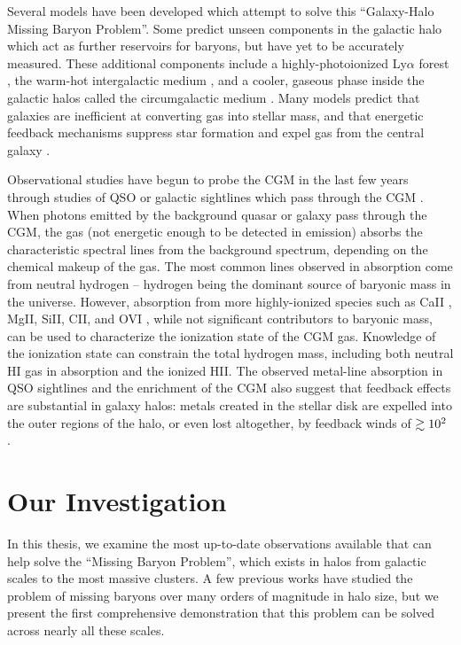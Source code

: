 Several models have been developed which attempt to solve this
``Galaxy-Halo Missing Baryon Problem''. Some predict unseen components
in the galactic halo which act as further reservoirs for baryons, but
have yet to be accurately measured.  These additional components
include a highly-photoionized Ly$\alpha$ forest \citep{Sargent1980,
  Cen1994}, the warm-hot intergalactic medium \citep[WHIM][]{Cen1999,
  Dave1999}, and a cooler, gaseous phase inside the galactic halos
called the circumgalactic medium \citep[CGM][]{Bahcall1969,
  Bergeron1985, Lanzetta1995}. Many models predict that galaxies are inefficient at
converting gas into stellar mass, and that energetic feedback
mechanisms suppress star formation and expel gas from the central
galaxy \citep{Somerville1999, Oppenheimer2010}. 

Observational studies have begun to probe the CGM in the last few
years through studies of QSO or galactic sightlines which pass through
the CGM \citep{Steidel2010, Prochaska2011, Tumlinson2011,
  Werk2013}. When photons emitted by the background quasar or galaxy
pass through the CGM, the gas (not energetic enough to be detected in
emission) absorbs the characteristic spectral lines from the
background spectrum, depending on the chemical makeup of the gas. The
most common lines observed in absorption come from neutral hydrogen --
hydrogen being the dominant source of baryonic mass in the
universe. However, absorption from more highly-ionized species such as
CaII \citep{Zhu2013}, MgII, SiII, CII, and OVI \citep{Tumlinson2011,
  Werk2014}, while not significant contributors to baryonic mass, can
be used to characterize the ionization state of the CGM gas. Knowledge
of the ionization state can constrain the total hydrogen mass,
including both neutral HI gas in absorption and the ionized HII. The
observed metal-line absorption in QSO sightlines and the enrichment of
the CGM also suggest that feedback effects are substantial in galaxy
halos: metals created in the stellar disk are expelled into the outer
regions of the halo, or even lost altogether, by feedback winds of
$\gtrsim 10^2$ \kms{} \citep{D'Odorico1991, Chen2010, Oppenheimer2012,
  Booth2012}.

\section{Our Investigation}
\label{s.investigation}

In this thesis, we examine the most up-to-date observations available
that can help solve the ``Missing Baryon Problem'', which exists in
halos from galactic scales to the most massive clusters. A few
previous works  have studied the problem of
missing baryons over many orders of magnitude in halo size, but we
present the first comprehensive demonstration that this problem can be
solved across nearly all these scales.

